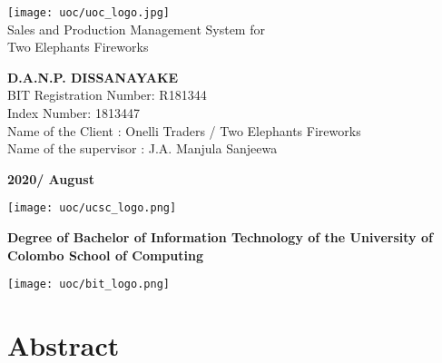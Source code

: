 \documentclass[12pt]{report}
\begin{document}
\onehalfspacing

\setlength{\parindent}{3em} %
\setlength{\parskip}{1em} %

\thispagestyle{empty}
\begin{titlepage}
	\begin{center}
		\vspace*{2cm}
		\texttt{[image: uoc/uoc\_logo.jpg]}\\
		\vspace{1cm}
		{\LARGE Sales and Production Management System for \\Two Elephants Fireworks}
		\vspace{2cm}
		\begin{large}

			\textbf{D.A.N.P. DISSANAYAKE}\\
			\vspace{2cm}
			BIT Registration Number: R181344 \\
			Index Number: 1813447 \\
			Name of the Client :  Onelli Traders / Two Elephants Fireworks \\
			Name of the supervisor :  J.A. Manjula Sanjeewa \\

			\vspace{1cm}

			\bf{2020/ August}

			\vspace{2.5cm}

			\vfill


			\texttt{[image: uoc/ucsc\_logo.png]}%
			\begin{minipage}[b]{0.7\textwidth}
				\centering
				{\small \bf Degree of Bachelor of Information Technology of the University of Colombo School of Computing}
			\end{minipage}%
			\texttt{[image: uoc/bit\_logo.png]}
		\end{large}
	\end{center}
\end{titlepage}

\newpage
\thispagestyle{plain}
\setcounter{page}{2}
\chapter*{\Huge Abstract}
\end{document}
